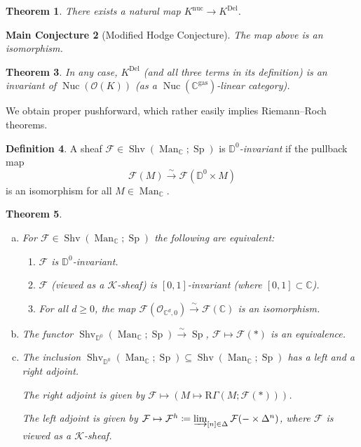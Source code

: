 \documentclass[draft]{amsart}
\newcommand{\DD}{\mathbb{D}}
\newcommand{\CC}{\mathbb{C}}
\newcommand{\R}{\mathrm{R}}
\renewcommand{\O}{\mathcal{O}}
\newcommand{\cat}[1]{\mathcal{#1}}
\newcommand{\sheaf}[1]{\mathcal{#1}}
\newcommand{\isoto}{\mathbin{\xrightarrow{\sim}}}
\newcommand{\blank}{-} %
\DeclareMathOperator{\Man}{Man}
\DeclareMathOperator{\Shv}{Shv}
\DeclareMathOperator{\Nuc}{Nuc}
\DeclareMathOperator{\Sp}{Sp}
\newtheorem{thm}{Theorem}[section]
\newtheorem{mainconj}[thm]{Main Conjecture}
\theoremstyle{definition}
\newtheorem{defn}[thm]{Definition}
\begin{document}
\begin{thm}
There exists a natural map $K^{\mathrm{nuc}} \to K^{\mathrm{Del}}$.
\end{thm}

\begin{mainconj}[Modified Hodge Conjecture]
The map above is an isomorphism.
\end{mainconj}

\begin{thm}
In any case, $K^{\mathrm{Del}}$ (and all three terms in its definition) is an invariant of $\Nuc(\O(K))$ (as a $\Nuc(\CC^{\mathrm{gas}})$-linear category).
\end{thm}

We obtain proper pushforward, which rather easily implies Riemann--Roch theorems.

\begin{defn}
A sheaf $\sheaf F\in \Shv(\Man_{\CC}; \Sp)$ is \emph{$\DD^0$-invariant} if the pullback map
\[
\sheaf F(M) \isoto \sheaf F(\DD^0\times M)
\]
is an isomorphism for all $M\in \Man_{\CC}$.
\end{defn}

\begin{thm}
\begin{enumerate}[(a)] 
\item For $\sheaf F\in \Shv(\Man_{\CC}; \Sp)$ the following are equivalent:
\begin{enumerate}[(1)]
\item $\sheaf F$ is $\DD^0$-invariant.
\item  $\sheaf F$ (viewed as a $\cat K$-sheaf) is $[0,1]$-invariant (where $[0,1] \subset \CC$).

\item For all $d\ge0$, the map $\sheaf F(\O_{\CC^d, 0}) \isoto \sheaf F(\CC)$ is an isomorphism.
\end{enumerate}

\item The functor $\Shv_{\DD^0}(\Man_{\CC}; \Sp)\isoto \Sp$, $\sheaf F\mapsto \sheaf F(*)$ is an equivalence.

\item The inclusion $\Shv_{\DD^0}(\Man_{\CC};\Sp)\subseteq \Shv(\Man_{\CC}; \Sp)$ has a left and a right adjoint.

The right adjoint is given by $\sheaf F\mapsto (M\mapsto \R\Gamma(M; \sheaf F(*)))$.

The left adjoint is given by $\sheaf F \mapsto \sheaf F^h\coloneqq \varinjlim_{[n]\in \Delta} \sheaf F(\blank \times \Delta^n)$, where $\sheaf F$ is viewed as a $\cat K$-sheaf.
\end{enumerate}
\end{thm}
\end{document}
